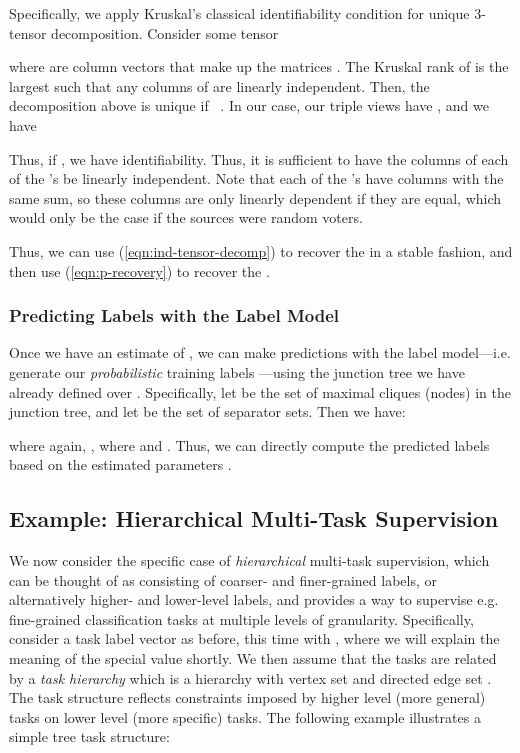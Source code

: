 \documentclass[letterpaper]{article}
\begin{document}
\begin{appendix}
Specifically, we apply Kruskal's classical identifiability condition for unique 3-tensor decomposition.
Consider some tensor 

where  are column vectors that make up the matrices . 
The Kruskal rank  of  is the largest  such that any  columns of  are linearly independent.
Then, the decomposition above is unique if ~\cite{kruskal77, bhaskara14}.
In our case, our triple views have , and we have

Thus, if , we have identifiability.
Thus, it is sufficient to have the columns of each of the 's be linearly independent.
Note that each of the 's have columns with the same sum, so these columns are only linearly dependent if they are equal, which would only be the case if the sources were random voters.

Thus, we can use (\ref{eqn:ind-tensor-decomp}) to recover the  in a stable fashion, and then use (\ref{eqn:p-recovery}) to recover the .

\subsubsection{Predicting Labels with the Label Model}
\label{appendix:label-model-predictions}
Once we have an estimate of , we can make predictions with the label model---i.e. generate our \textit{probabilistic} training labels ---using the junction tree we have already defined over .
Specifically, let  be the set of maximal cliques (nodes) in the junction tree, and let  be the set of separator sets.
Then we have:

where again, , where  and .
Thus, we can directly compute the predicted labels  based on the estimated parameters .

\subsection{Example: Hierarchical Multi-Task Supervision}
\label{appendix:hierarchical}
We now consider the specific case of \textit{hierarchical} multi-task supervision, which can be thought of as consisting of coarser- and finer-grained labels, or alternatively higher- and lower-level labels, and provides a way to supervise e.g. fine-grained classification tasks at multiple levels of granularity.
Specifically, consider a task label vector  as before, this time with , where we will explain the meaning of the special value  shortly.
We then assume that the tasks  are related by a \textit{task hierarchy} which is a hierarchy  with vertex set  and directed edge set .
 The task structure reflects constraints imposed by higher level (more general) tasks on lower level (more specific) tasks.
 The following example illustrates a simple tree  task structure:


\end{appendix}
\end{document}
